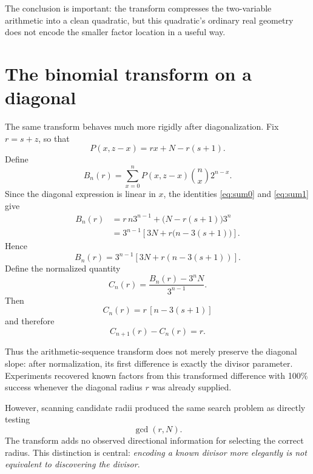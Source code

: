 \documentclass[11pt,a4paper]{article}
\begin{document}
The conclusion is important: the transform compresses the two-variable arithmetic into a clean quadratic, but this quadratic's ordinary real geometry does not encode the smaller factor location in a useful way.

\section{The binomial transform on a diagonal}
\label{sec:diagonaltransform}

The same transform behaves much more rigidly after diagonalization. Fix \(r=s+z\), so that
\[
P(x,z-x)=rx+N-r(s+1).
\]
Define
\begin{equation}
B_n(r)=\sum_{x=0}^{n}P(x,z-x)\binom{n}{x}2^{n-x}.
\label{eq:Bn}
\end{equation}
Since the diagonal expression is linear in \(x\), the identities \eqref{eq:sum0} and \eqref{eq:sum1} give
\begin{align}
B_n(r)
&=r\,n3^{n-1}+\bigl(N-r(s+1)\bigr)3^n\\
&=3^{n-1}\left[3N+r\bigl(n-3(s+1)\bigr)\right].
\end{align}
Hence
\begin{equation}
\boxed{
B_n(r)=3^{n-1}\left[3N+r(n-3(s+1))\right].
}
\label{eq:Bnclosed}
\end{equation}
Define the normalized quantity
\begin{equation}
C_n(r)=\frac{B_n(r)-3^nN}{3^{n-1}}.
\end{equation}
Then
\begin{equation}
\boxed{C_n(r)=r\,[n-3(s+1)]}
\label{eq:Cn}
\end{equation}
and therefore
\begin{equation}
\boxed{C_{n+1}(r)-C_n(r)=r.}
\label{eq:Cdifference}
\end{equation}

Thus the arithmetic-sequence transform does not merely preserve the diagonal slope: after normalization, its first difference is exactly the divisor parameter. Experiments recovered known factors from this transformed difference with 100\% success whenever the diagonal radius \(r\) was already supplied.

However, scanning candidate radii produced the same search problem as directly testing
\[
\gcd(r,N).
\]
The transform adds no observed directional information for selecting the correct radius. This distinction is central: \emph{encoding a known divisor more elegantly is not equivalent to discovering the divisor}.
\end{document}

